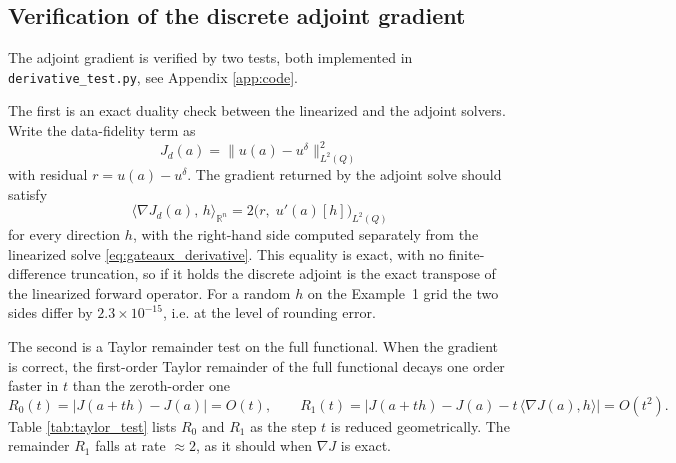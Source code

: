 \subsection{Verification of the discrete adjoint gradient}\label{sec:adjoint_verification}

The adjoint gradient is verified by two tests,
both implemented in \texttt{derivative\_test.py}, see Appendix \ref{app:code}.

The first is an exact duality check between the linearized and the adjoint solvers.
Write the data-fidelity term as
\begin{equation*}
    J_d(a)=\|u(a)-u^\delta\|^2_{L^2(Q)}
\end{equation*}
with residual $r = u(a)-u^\delta$.
The gradient returned by the adjoint solve should satisfy
\begin{equation*}
    \bigl\langle \nabla J_d(a),\, h\bigr\rangle_{\mathbb{R}^n}
    = 2\bigl(r,\; u'(a)[h]\bigr)_{L^2(Q)}
\end{equation*}
for every direction $h$,
with the right-hand side computed separately from the linearized solve \eqref{eq:gateaux_derivative}.
This equality is exact, with no finite-difference truncation,
so if it holds the discrete adjoint is the exact transpose of the linearized forward operator.
For a random $h$ on the Example~1 grid the two sides differ by $2.3\times10^{-15}$,
i.e. at the level of rounding error.

The second is a Taylor remainder test on the full functional.
When the gradient is correct, the first-order Taylor remainder of the full functional decays
one order faster in $t$ than the zeroth-order one
\begin{equation*}
    R_0(t) = \bigl|J(a+th) - J(a)\bigr| = O(t),
    \qquad
    R_1(t) = \bigl|J(a+th) - J(a) - t\,\langle\nabla J(a), h\rangle\bigr| = O(t^2).
\end{equation*}
Table \ref{tab:taylor_test} lists $R_0$ and $R_1$ as the step $t$ is reduced geometrically.
The remainder $R_1$ falls at rate $\approx 2$, as it should when $\nabla J$ is exact.

